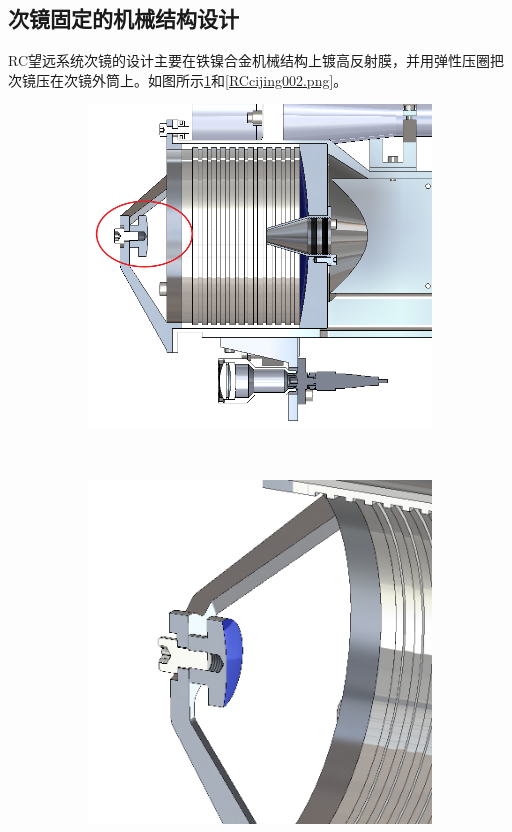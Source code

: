 \subsection{次镜固定的机械结构设计}
RC望远系统次镜的设计主要在铁镍合金机械结构上镀高反射膜，并用弹性压圈把次镜压在次镜外筒上。如图所示\ref{RCcijing001.png}和\ref{RCcijing002.png}。
\begin{figure}[!htbp]
	\centering
	\begin{subfigure}[c]{0.5\textwidth}
		\includegraphics[width=\textwidth]{./Img/RCcijing001.png}
		\caption{}
		\label{RCcijing001.png}
	\end{subfigure}%
	~%
	\begin{subfigure}[c]{0.5\textwidth}
		\includegraphics[width=\textwidth]{./Img/RCcijing002.png}

\end{subfigure}
\end{figure}
